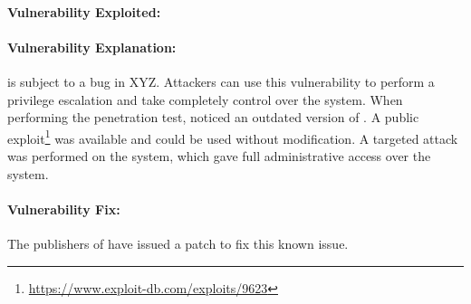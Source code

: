 \paragraph{Vulnerability Exploited:}
\vulnx

\paragraph{Vulnerability Explanation:}
\product{} is subject to a bug in XYZ.
Attackers can use this vulnerability to perform a privilege escalation and take completely control over the system.
When performing the penetration test, \name{} noticed an outdated version of \product{}. 
A public exploit\footnote{\url{https://www.exploit-db.com/exploits/9623}} was available and could be used without modification.
A targeted attack was performed on the system, which gave \name{} full administrative access over the system.

\paragraph{Vulnerability Fix:}
The publishers of \product{} have issued a patch to fix this known issue.

